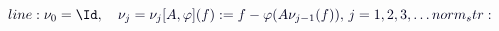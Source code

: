 \documentclass[12pt]{article}
\begin{document}
\makeatletter
\renewcommand*{\@textcolor}[3]{%
  \protect\leavevmode
  \begingroup
    \color#1{#2}#3%
  \endgroup
}
\makeatother
\begin{displaymath}
\mathcolor[RGB]{0,0,15}{line:
\nu_0=\Id,} \quad \mathcolor[RGB]{0,0,30}{\nu_j=\nu_j[A,\varphi](f):=f-\varphi(A\nu_{j-1}(f)),\,j=1,2,3,\dots

norm_str:}
\end{displaymath}
\end{document}
